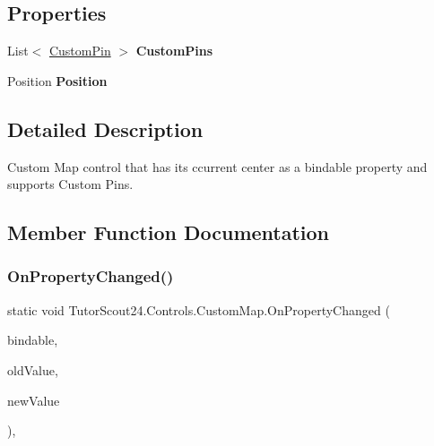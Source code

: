 \subsection*{Properties}
\begin{DoxyCompactItemize}
\item 
\mbox{\label{class_tutor_scout24_1_1_controls_1_1_custom_map_aff753c3f6ab48de6ae88b2e8eb674ed5}} 
List$<$ \mbox{\hyperlink{class_tutor_scout24_1_1_controls_1_1_custom_pin}{Custom\+Pin}} $>$ {\bfseries Custom\+Pins}
\item 
\mbox{\label{class_tutor_scout24_1_1_controls_1_1_custom_map_ad00a8db55c35d22f82d8250b6146d3fe}} 
Position {\bfseries Position}
\end{DoxyCompactItemize}


\subsection{Detailed Description}
Custom Map control that has its ccurrent center as a bindable property and supports Custom Pins. 



\subsection{Member Function Documentation}
\mbox{\label{class_tutor_scout24_1_1_controls_1_1_custom_map_a46bd4bc57d2bb8150ab15b3b6337b01b}} 
\subsubsection{\texorpdfstring{On\+Property\+Changed()}{OnPropertyChanged()}}
{\footnotesize\ttfamily static void Tutor\+Scout24.\+Controls.\+Custom\+Map.\+On\+Property\+Changed (\begin{DoxyParamCaption}\item[{Bindable\+Object}]{bindable,  }\item[{object}]{old\+Value,  }\item[{object}]{new\+Value }\end{DoxyParamCaption})\hspace{0.3cm}{\ttfamily [inline]}, {\ttfamily [static]}}



